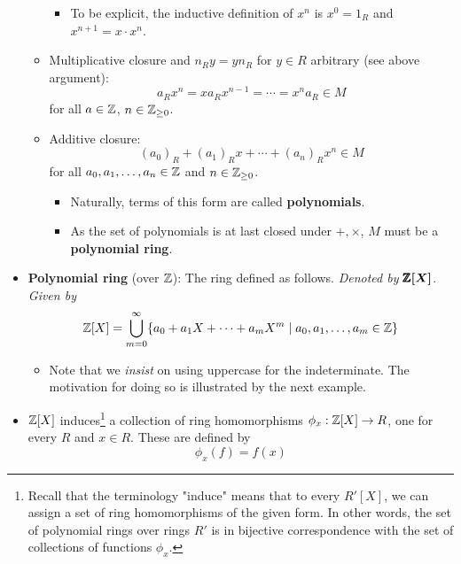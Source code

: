 \documentclass[../notes.tex]{subfiles}
\begin{document}
\begin{itemize}
\begin{itemize}
\begin{itemize}
            \item To be explicit, the inductive definition of $x^n$ is $x^0=1_R$ and $x^{n+1}=x\cdot x^n$.
        \end{itemize}
        \item Multiplicative closure and $n_Ry=yn_R$ for $y\in R$ arbitrary (see above argument):
        \begin{equation*}
            a_Rx^n=xa_Rx^{n-1}=\cdots=x^na_R \in M
        \end{equation*}
        for all $a\in\mathbb{Z}$, $n\in{\mathbb{Z}_{\geq 0}}$.
        \item Additive closure:
        \begin{equation*}
            (a_0)_R+(a_1)_Rx+\cdots+(a_n)_Rx^n \in M
        \end{equation*}
        for all $a_0,a_1,\dots,a_n\in\mathbb{Z}$ and $n\in{\mathbb{Z}_{\geq 0}}$.
        \begin{itemize}
            \item Naturally, terms of this form are called \textbf{polynomials}.
            \item As the set of polynomials is at last closed under $+,\times$, $M$ must be a \textbf{polynomial ring}.
        \end{itemize}
    \end{itemize}
    \pagebreak
    \item \textbf{Polynomial ring} (over $\mathbb{Z}$): The ring defined as follows. \emph{Denoted by} $\bm{\pmb{\mathbb{Z}}[X]}$. \emph{Given by}
    \begin{equation*}
        \mathbb{Z}[X] = \bigcup_{m=0}^\infty\{a_0+a_1X+\cdots+a_mX^m\mid a_0,a_1,\dots,a_m\in\mathbb{Z}\}
    \end{equation*}
    \begin{itemize}
        \item Note that we \emph{insist} on using uppercase for the indeterminate. The motivation for doing so is illustrated by the next example.
    \end{itemize}
    \item $\mathbb{Z}[X]$ induces\footnote{Recall that the terminology "induce" means that to every $R'[X]$, we can assign a set of ring homomorphisms of the given form. In other words, the set of polynomial rings over rings $R'$ is in bijective correspondence with the set of collections of functions $\phi_x$.} a collection of ring homomorphisms $\phi_x:\mathbb{Z}[X]\to R$, one for every $R$ and $x\in R$. These are defined by
    \begin{equation*}
        \phi_x(f) = f(x)
    \end{equation*}

\end{itemize}
\end{document}
